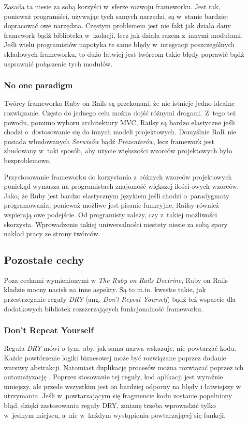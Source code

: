 Zasada ta niesie za sobą korzyści w~sferze rozwoju frameworku. Jest tak, ponieważ programiści, używając tych samych narzędzi, są w~stanie bardziej dopracować owe narzędzia. Częstym problemem jest nie fakt jak działa dany framework bądź biblioteka w~izolacji, lecz jak działa razem z~innymi modułami. Jeśli wielu programistów napotyka te same błędy w~integracji poszczególnych składowych frameworku, to dużo łatwiej jest twórcom takie błędy poprawić bądź usprawnić połączenie tych modułów.

\subsubsection{No one paradigm}
Twórcy frameworka Ruby on Rails są przekonani, że nie istnieje jedno idealne rozwiązanie. Często do jednego celu można dojść różnymi drogami. Z~tego też powodu, pomimo wyboru architektury MVC, Railsy są bardzo elastyczne jeśli chodzi o~dostosowanie się do innych modeli projektowych. Domyślnie RoR nie posiada wbudowanych \textit{Serwisów} bądź \textit{Prezenterów}, lecz framework jest zbudowany w~taki sposób, aby użycie większości wzorców projektowych było bezproblemowe.

Przystosowanie frameworku do korzystania z~różnych wzorców projektowych poniekąd wymusza na programistach znajomość większej ilości owych wzorców. Jako, że Ruby jest bardzo elastycznym językiem jeśli chodzi o~paradygmaty programowania, ponieważ możliwe jest pisanie funkcyjne, Railsy również wspierają owe podejście. Od programisty zależy, czy z~takiej możliwości skorzysta. Wprowadzenie takiej uniwersalności niestety niesie za sobą spory nakład pracy ze strony twórców.

\subsection{Pozostałe cechy}
Poza cechami wymienionymi w \textit{The Ruby on Rails Doctrine}, Ruby on Rails kładzie mocny nacisk na inne aspekty. Są to m.in. kwestie takie, jak przestrzeganie reguły \textit{DRY} (ang. \textit{Don't Repeat Yourself}) bądź też wsparcie dla dodatkowych bibliotek rozszerzających funkcjonalność frameworku.

\subsubsection{Don't Repeat Yourself}
Reguła \textit{DRY} mówi o tym, aby, jak sama nazwa wskazuje, nie powtarzać kodu. Każde powtórzenie logiki biznesowej może być rozwiązane poprzez dodanie warstwy abstrakcji. Natomiast duplikację procesów można rozwiązać poprzez ich automatyzację \cite{dry}. Poprzez stosowanie tej reguły, kod aplikacji jest wyraźnie mniejszy, ale przede wszystkim jest on bardziej odporny na błędy i łatwiejszy w utrzymaniu. Jeśli w~powtarzającym się fragmencie kodu zostanie popełniony błąd, dzięki zastosowaniu reguły DRY, zmianę trzeba wprowadzić tylko w~jednym miejscu, a~nie w~każdym wystąpieniu powtarzającej się funkcji.

